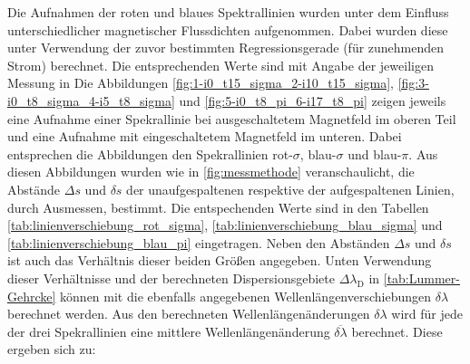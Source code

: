 Die Aufnahmen der roten und blaues Spektrallinien wurden
unter dem Einfluss unterschiedlicher magnetischer Flussdichten
aufgenommen. Dabei wurden diese unter Verwendung der zuvor bestimmten
Regressionsgerade (für zunehmenden Strom) berechnet. Die entsprechenden Werte
sind mit Angabe der jeweiligen Messung in %
%
Die Abbildungen \ref{fig:1-i0_t15_sigma_2-i10_t15_sigma},
\ref{fig:3-i0_t8_sigma_4-i5_t8_sigma}
und \ref{fig:5-i0_t8_pi_6-i17_t8_pi} zeigen jeweils eine Aufnahme einer
Spekrallinie bei ausgeschaltetem Magnetfeld im oberen Teil und eine Aufnahme
mit eingeschaltetem Magnetfeld im unteren. Dabei entsprechen die Abbildungen den
Spekrallinien rot-$\sigma$, blau-$\sigma$ und blau-$\pi$.
Aus diesen Abbildungen wurden wie in \ref{fig:messmethode} veranschaulicht, die Abstände
$\Delta s$ und $\delta s$ der unaufgespaltenen respektive der aufgespaltenen
Linien, durch Ausmessen, bestimmt. Die entspechenden Werte sind in den Tabellen
\ref{tab:linienverschiebung_rot_sigma}, \ref{tab:linienverschiebung_blau_sigma}
und \ref{tab:linienverschiebung_blau_pi} eingetragen. Neben den Abständen
$\Delta s$ und $\delta s$ ist auch das Verhältnis dieser beiden Größen angegeben.
Unten Verwendung dieser Verhältnisse und der berechneten Dispersionsgebiete
$\Delta \lambda_{\mathrm{D}}$ in \ref{tab:Lummer-Gehrcke} können mit
die ebenfalls angegebenen Wellenlängenverschiebungen $\delta \lambda$ berechnet
werden.
%
%
%
%
%
%
%
%
%
Aus den berechneten Wellenlängenänderungen $\delta \lambda$
wird für jede der drei Spekrallinien eine mittlere Wellenlängenänderung $\overline{\delta \lambda}$
berechnet. Diese ergeben sich zu:
%
